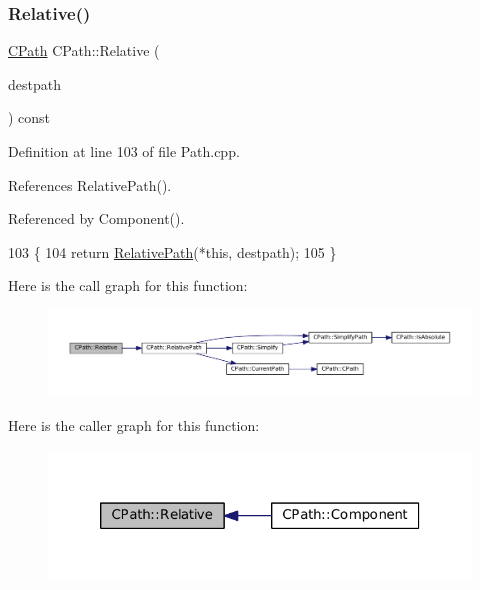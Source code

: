 \subsubsection{\texorpdfstring{Relative()}{Relative()}}
{\footnotesize\ttfamily \hyperlink{classCPath}{C\+Path} C\+Path\+::\+Relative (\begin{DoxyParamCaption}\item[{const \hyperlink{classCPath}{C\+Path} \&}]{destpath }\end{DoxyParamCaption}) const}



Definition at line 103 of file Path.\+cpp.



References Relative\+Path().



Referenced by Component().


\begin{DoxyCode}
103                                                 \{
104     \textcolor{keywordflow}{return} \hyperlink{classCPath_a76f73670ecc0a434c2f8a1ea0f1a040e}{RelativePath}(*\textcolor{keyword}{this}, destpath);
105 \}
\end{DoxyCode}
Here is the call graph for this function\+:\nopagebreak
\begin{figure}[H]
\begin{center}
\leavevmode
\includegraphics[width=350pt]{classCPath_aaf49ee9d0f8ed1ffa6bb5e18aba86b4f_cgraph}
\end{center}
\end{figure}
Here is the caller graph for this function\+:\nopagebreak
\begin{figure}[H]
\begin{center}
\leavevmode
\includegraphics[width=320pt]{classCPath_aaf49ee9d0f8ed1ffa6bb5e18aba86b4f_icgraph}
\end{center}
\end{figure}
\hypertarget{classCPath_a76f73670ecc0a434c2f8a1ea0f1a040e}{}\label{classCPath_a76f73670ecc0a434c2f8a1ea0f1a040e} 
